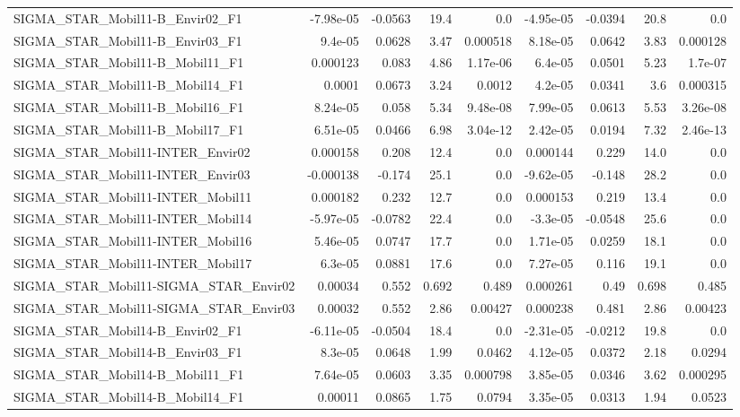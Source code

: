 \begin{tabular}{lrrrrrrrr}
SIGMA_STAR_Mobil11-B_Envir02_F1 & -7.98e-05 & -0.0563 & 19.4 & 0.0 & -4.95e-05 & -0.0394 & 20.8 & 0.0 \\
SIGMA_STAR_Mobil11-B_Envir03_F1 & 9.4e-05 & 0.0628 & 3.47 & 0.000518 & 8.18e-05 & 0.0642 & 3.83 & 0.000128 \\
SIGMA_STAR_Mobil11-B_Mobil11_F1 & 0.000123 & 0.083 & 4.86 & 1.17e-06 & 6.4e-05 & 0.0501 & 5.23 & 1.7e-07 \\
SIGMA_STAR_Mobil11-B_Mobil14_F1 & 0.0001 & 0.0673 & 3.24 & 0.0012 & 4.2e-05 & 0.0341 & 3.6 & 0.000315 \\
SIGMA_STAR_Mobil11-B_Mobil16_F1 & 8.24e-05 & 0.058 & 5.34 & 9.48e-08 & 7.99e-05 & 0.0613 & 5.53 & 3.26e-08 \\
SIGMA_STAR_Mobil11-B_Mobil17_F1 & 6.51e-05 & 0.0466 & 6.98 & 3.04e-12 & 2.42e-05 & 0.0194 & 7.32 & 2.46e-13 \\
SIGMA_STAR_Mobil11-INTER_Envir02 & 0.000158 & 0.208 & 12.4 & 0.0 & 0.000144 & 0.229 & 14.0 & 0.0 \\
SIGMA_STAR_Mobil11-INTER_Envir03 & -0.000138 & -0.174 & 25.1 & 0.0 & -9.62e-05 & -0.148 & 28.2 & 0.0 \\
SIGMA_STAR_Mobil11-INTER_Mobil11 & 0.000182 & 0.232 & 12.7 & 0.0 & 0.000153 & 0.219 & 13.4 & 0.0 \\
SIGMA_STAR_Mobil11-INTER_Mobil14 & -5.97e-05 & -0.0782 & 22.4 & 0.0 & -3.3e-05 & -0.0548 & 25.6 & 0.0 \\
SIGMA_STAR_Mobil11-INTER_Mobil16 & 5.46e-05 & 0.0747 & 17.7 & 0.0 & 1.71e-05 & 0.0259 & 18.1 & 0.0 \\
SIGMA_STAR_Mobil11-INTER_Mobil17 & 6.3e-05 & 0.0881 & 17.6 & 0.0 & 7.27e-05 & 0.116 & 19.1 & 0.0 \\
SIGMA_STAR_Mobil11-SIGMA_STAR_Envir02 & 0.00034 & 0.552 & 0.692 & 0.489 & 0.000261 & 0.49 & 0.698 & 0.485 \\
SIGMA_STAR_Mobil11-SIGMA_STAR_Envir03 & 0.00032 & 0.552 & 2.86 & 0.00427 & 0.000238 & 0.481 & 2.86 & 0.00423 \\
SIGMA_STAR_Mobil14-B_Envir02_F1 & -6.11e-05 & -0.0504 & 18.4 & 0.0 & -2.31e-05 & -0.0212 & 19.8 & 0.0 \\
SIGMA_STAR_Mobil14-B_Envir03_F1 & 8.3e-05 & 0.0648 & 1.99 & 0.0462 & 4.12e-05 & 0.0372 & 2.18 & 0.0294 \\
SIGMA_STAR_Mobil14-B_Mobil11_F1 & 7.64e-05 & 0.0603 & 3.35 & 0.000798 & 3.85e-05 & 0.0346 & 3.62 & 0.000295 \\
SIGMA_STAR_Mobil14-B_Mobil14_F1 & 0.00011 & 0.0865 & 1.75 & 0.0794 & 3.35e-05 & 0.0313 & 1.94 & 0.0523 \\

\end{tabular}
